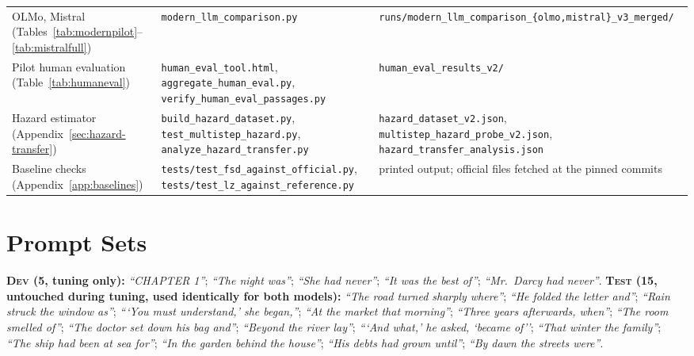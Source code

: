 \documentclass[11pt]{article}
\begin{document}
\begin{table}[H]
\begin{tabular}{@{}p{3.6cm}p{4.6cm}p{6.8cm}@{}}
OLMo, Mistral (Tables~\ref{tab:modernpilot}--\ref{tab:mistralfull}) & \texttt{modern\_\allowbreak{}llm\_\allowbreak{}comparison.py} & \texttt{runs/modern\_\allowbreak{}llm\_\allowbreak{}comparison\_\allowbreak{}\{olmo,mistral\}\_\allowbreak{}v3\_\allowbreak{}merged/} \\
Pilot human evaluation (Table~\ref{tab:humaneval}) & \texttt{human\_\allowbreak{}eval\_\allowbreak{}tool.html}, \texttt{aggregate\_\allowbreak{}human\_\allowbreak{}eval.py}, \texttt{verify\_\allowbreak{}human\_\allowbreak{}eval\_\allowbreak{}passages.py} & \texttt{human\_\allowbreak{}eval\_\allowbreak{}results\_\allowbreak{}v2/} \\
Hazard estimator (Appendix~\ref{sec:hazard-transfer}) & \texttt{build\_\allowbreak{}hazard\_\allowbreak{}dataset.py}, \texttt{test\_\allowbreak{}multistep\_\allowbreak{}hazard.py}, \texttt{analyze\_\allowbreak{}hazard\_\allowbreak{}transfer.py} & \texttt{hazard\_\allowbreak{}dataset\_\allowbreak{}v2.json}, \texttt{multistep\_\allowbreak{}hazard\_\allowbreak{}probe\_\allowbreak{}v2.json}, \texttt{hazard\_\allowbreak{}transfer\_\allowbreak{}analysis.json} \\
Baseline checks (Appendix~\ref{app:baselines}) & \texttt{tests/test\_\allowbreak{}fsd\_\allowbreak{}against\_\allowbreak{}official.py}, \texttt{tests/test\_\allowbreak{}lz\_\allowbreak{}against\_\allowbreak{}reference.py} & printed output; official files fetched at the pinned commits \\
\bottomrule
\end{tabular}
\end{table}

\section{Prompt Sets}
\label{app:prompts}
\textbf{\textsc{Dev} (5, tuning only):} \emph{``CHAPTER 1''}; \emph{``The night was''}; \emph{``She had never''}; \emph{``It was the best of''}; \emph{``Mr.\ Darcy had never''}.
\textbf{\textsc{Test} (15, untouched during tuning, used identically for both models):} \emph{``The road turned sharply where''}; \emph{``He folded the letter and''}; \emph{``Rain struck the window as''}; \emph{```You must understand,' she began,''}; \emph{``At the market that morning''}; \emph{``Three years afterwards, when''}; \emph{``The room smelled of''}; \emph{``The doctor set down his bag and''}; \emph{``Beyond the river lay''}; \emph{```And what,' he asked, `became of''}; \emph{``That winter the family''}; \emph{``The ship had been at sea for''}; \emph{``In the garden behind the house''}; \emph{``His debts had grown until''}; \emph{``By dawn the streets were''}.
\end{document}
